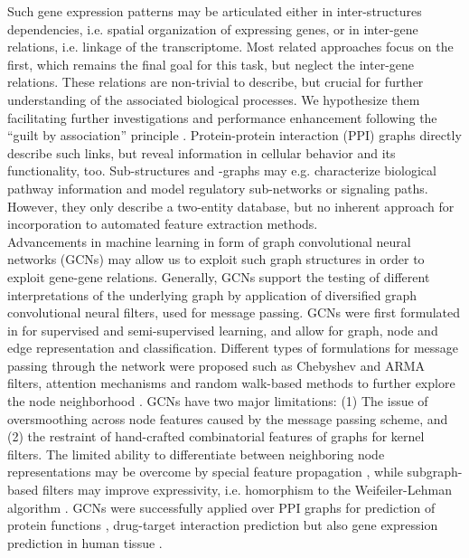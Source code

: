 \documentclass[]{article}
\renewcommand{\cite}{\citep}
\begin{document}
Such gene expression patterns may be articulated either in inter-structures dependencies, i.e. spatial organization of expressing genes, or in inter-gene relations, i.e. linkage of the transcriptome. Most related approaches focus on the first, which remains the final goal for this task, but neglect the inter-gene relations. These relations are non-trivial to describe, but crucial for further understanding of the associated biological processes. We hypothesize them facilitating further investigations and performance enhancement following the ``guilt by association'' principle \cite{Oliver2000, Gillis2012}.
Protein-protein interaction (PPI) graphs directly describe such links, but reveal information in cellular behavior and its functionality, too. Sub-structures and -graphs may e.g. characterize biological pathway information and model regulatory sub-networks or signaling paths. However, they only describe a two-entity database, but no inherent approach for incorporation to automated feature extraction methods. \\

Advancements in machine learning in form of graph convolutional neural networks (GCNs) may allow us to exploit such graph structures in order to exploit gene-gene relations. Generally, GCNs support the testing of different interpretations of the underlying graph by application of diversified graph convolutional neural filters, used for message passing. GCNs were first formulated in \citet{GCNConv} for supervised and semi-supervised learning, and allow for graph, node and edge representation and classification. Different types of formulations for message passing through the network were proposed such as Chebyshev \cite{ChebConv} and ARMA \cite{ArmaConv} filters, attention mechanisms \cite{GATConv} and random walk-based methods to further explore the node neighborhood \cite{APPNPConv, SAGEConv}. GCNs have two major limitations: (1) The issue of oversmoothing across node features caused by the message passing scheme, and (2) the restraint of hand-crafted combinatorial features of graphs for kernel filters. The limited ability to differentiate between neighboring node representations may be overcome by special feature propagation \cite{GENConv2020}, while subgraph-based filters \citet{feng2022kergnns} may improve expressivity, i.e. homorphism to the Weifeiler-Lehman algorithm \cite{leman1968reduction}. 
GCNs were successfully applied over PPI graphs for prediction of protein functions \cite{Zitnik2017}, drug-target interaction prediction \cite{hinnerichs2021dti} but also gene expression prediction in human tissue \cite{schulte2021integration, wang2021mogonet}.\\ 
\end{document}
